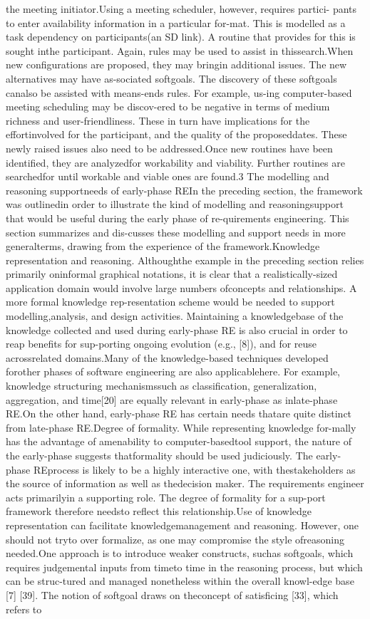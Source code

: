 the meeting initiator.Using a meeting scheduler, however, requires partici-
pants to enter availability information in a particular for-mat. This is modelled as a task dependency on participants(an SD link). A routine that provides for this is sought inthe participant. Again, rules may be used to assist in thissearch.When new conﬁgurations are proposed, they may bringin additional issues. The new alternatives may have as-sociated softgoals. The discovery of these softgoals canalso be assisted with means-ends rules. For example, us-ing computer-based meeting scheduling may be discov-ered to be negative in terms of medium richness and user-friendliness. These in turn have implications for the effortinvolved for the participant, and the quality of the proposeddates. These newly raised issues also need to be addressed.Once new routines have been identiﬁed, they are analyzedfor workability and viability. Further routines are searchedfor until workable and viable ones are found.3 The modelling and reasoning supportneeds of early-phase REIn the preceding section, the framework was outlinedin order to illustrate the kind of modelling and reasoningsupport that would be useful during the early phase of re-quirements engineering. This section summarizes and dis-cusses these modelling and support needs in more generalterms, drawing from the experience of the framework.Knowledge representation and reasoning. Althoughthe example in the preceding section relies primarily oninformal graphical notations, it is clear that a realistically-sized application domain would involve large numbers ofconcepts and relationships. A more formal knowledge rep-resentation scheme would be needed to support modelling,analysis, and design activities. Maintaining a knowledgebase of the knowledge collected and used during early-phase RE is also crucial in order to reap beneﬁts for sup-porting ongoing evolution (e.g., [8]), and for reuse acrossrelated domains.Many of the knowledge-based techniques developed forother phases of software engineering are also applicablehere. For example, knowledge structuring mechanismssuch as classiﬁcation, generalization, aggregation, and time[20] are equally relevant in early-phase as inlate-phase RE.On the other hand, early-phase RE has certain needs thatare quite distinct from late-phase RE.Degree of formality. While representing knowledge for-mally has the advantage of amenability to computer-basedtool support, the nature of the early-phase suggests thatformality should be used judiciously. The early-phase REprocess is likely to be a highly interactive one, with thestakeholders as the source of information as well as thedecision maker. The requirements engineer acts primarilyin a supporting role. The degree of formality for a sup-port framework therefore needsto reﬂect this relationship.Use of knowledge representation can facilitate knowledgemanagement and reasoning. However, one should not tryto over formalize, as one may compromise the style ofreasoning needed.One approach is to introduce weaker constructs, suchas softgoals, which requires judgemental inputs from timeto time in the reasoning process, but which can be struc-tured and managed nonetheless within the overall knowl-edge base [7] [39]. The notion of softgoal draws on theconcept of satisﬁcing [33], which refers to 